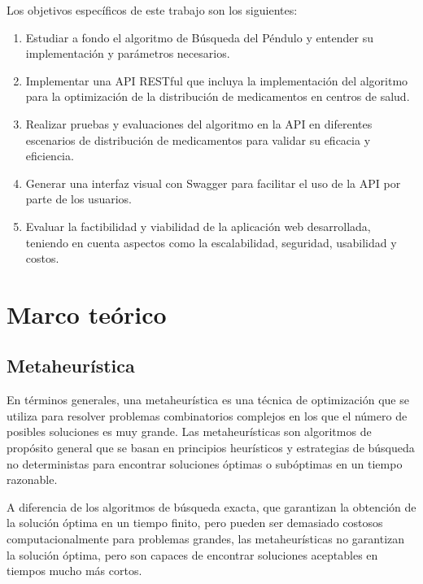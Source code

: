 \documentclass[conference]{IEEEtran}
\begin{document}
Los objetivos específicos de este trabajo son los siguientes:
\begin{enumerate}
    \item Estudiar a fondo el algoritmo de Búsqueda del Péndulo y entender su
          implementación y parámetros necesarios.
    \item Implementar una API RESTful que incluya la implementación del
          algoritmo para la optimización de la distribución de medicamentos en
          centros de
          salud.
    \item Realizar pruebas y evaluaciones del algoritmo en la API en diferentes
          escenarios de distribución de medicamentos para validar su eficacia y
          eficiencia.
    \item Generar una interfaz visual con Swagger para facilitar el uso de la
          API por parte de los usuarios.
    \item Evaluar la factibilidad y viabilidad de la aplicación web
          desarrollada, teniendo en cuenta aspectos como la escalabilidad,
          seguridad,
          usabilidad y costos.
\end{enumerate}

\section{Marco teórico}
\label{sec:MT}

\subsection{Metaheurística}
En términos generales, una metaheurística es una técnica de optimización que se
utiliza para resolver problemas combinatorios complejos en los que el número de
posibles soluciones es muy grande. Las metaheurísticas son algoritmos de
propósito general que se basan en principios heurísticos y estrategias de
búsqueda no deterministas para encontrar soluciones óptimas o subóptimas en un
tiempo razonable.

A diferencia de los algoritmos de búsqueda exacta, que garantizan la obtención
de la solución óptima en un tiempo finito, pero pueden ser demasiado costosos
computacionalmente para problemas grandes, las metaheurísticas no garantizan la
solución óptima, pero son capaces de encontrar soluciones aceptables en tiempos
mucho más cortos.
\end{document}
